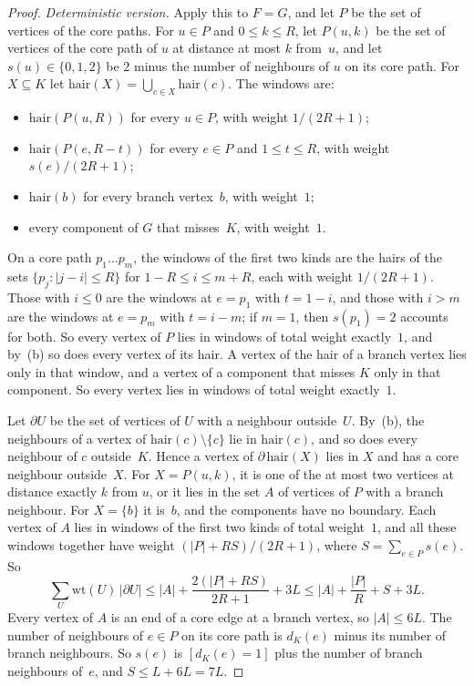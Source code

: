 \documentclass[11pt]{article}
\theoremstyle{remark}
\begin{document}
\begin{proof}
\emph{Deterministic version.} Apply this to $F=G$, and let $P$ be the set of vertices of the core
paths. For $u\in P$ and $0\le k\le R$, let $P(u,k)$ be the set of vertices of the core path of $u$ at
distance at most $k$ from~$u$, and let $s(u)\in\{0,1,2\}$ be $2$ minus the number of neighbours of $u$
on its core path. For $X\subseteq K$ let $\mathrm{hair}(X)=\bigcup_{c\in X}\mathrm{hair}(c)$. The
windows are:
\begin{itemize}
\item $\mathrm{hair}(P(u,R))$ for every $u\in P$, with weight $1/(2R+1)$;
\item $\mathrm{hair}(P(e,R-t))$ for every $e\in P$ and $1\le t\le R$, with weight $s(e)/(2R+1)$;
\item $\mathrm{hair}(b)$ for every branch vertex~$b$, with weight~$1$;
\item every component of $G$ that misses~$K$, with weight~$1$.
\end{itemize}
On a core path $p_1\dots p_m$, the windows of the first two kinds are the hairs of the sets
$\{p_j:|j-i|\le R\}$ for $1-R\le i\le m+R$, each with weight $1/(2R+1)$. Those with $i\le0$ are the
windows at $e=p_1$ with $t=1-i$, and those with $i>m$ are the windows at $e=p_m$ with $t=i-m$; if
$m=1$, then $s(p_1)=2$ accounts for both. So every vertex of $P$ lies in windows of total weight
exactly~$1$, and by~(b) so does every vertex of its hair. A vertex of the hair of a branch vertex lies
only in that window, and a vertex of a component that misses $K$ only in that component. So every
vertex lies in windows of total weight exactly~$1$.

Let $\partial U$ be the set of vertices of $U$ with a neighbour outside~$U$. By~(b), the neighbours of
a vertex of $\mathrm{hair}(c)\setminus\{c\}$ lie in $\mathrm{hair}(c)$, and so does every neighbour
of $c$ outside~$K$. Hence a vertex of $\partial\,\mathrm{hair}(X)$ lies in $X$ and has a
core neighbour outside~$X$. For $X=P(u,k)$, it is one of the at most two vertices at distance exactly
$k$ from $u$, or it lies in the set $A$ of vertices of $P$ with a branch neighbour. For $X=\{b\}$ it
is~$b$, and the components have no boundary. Each vertex of $A$ lies in windows of the first two kinds
of total weight~$1$, and all these windows together have weight $(|P|+RS)/(2R+1)$, where
$S=\sum_{e\in P}s(e)$. So
\[
  \sum_U\mathrm{wt}(U)\,|\partial U|\le|A|+\frac{2(|P|+RS)}{2R+1}+3L\le|A|+\frac{|P|}R+S+3L.
\]
Every vertex of $A$ is an end of a core edge at a branch vertex, so $|A|\le6L$. The number of
neighbours of $e\in P$ on its core path is $d_K(e)$ minus its number of branch neighbours. So $s(e)$
is $[d_K(e)=1]$ plus the number of branch neighbours of~$e$, and $S\le L+6L=7L$.


\end{proof}
\end{document}
